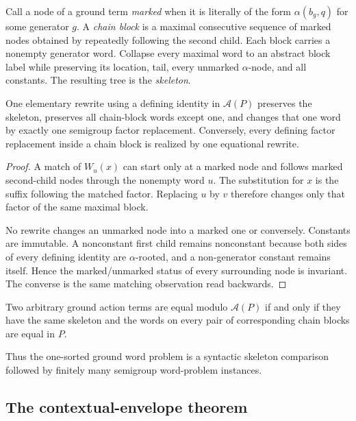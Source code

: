 Call a node of a ground term \emph{marked} when it is literally of the form $\alpha(b_g,q)$ for some generator $g$.  A \emph{chain block} is a maximal consecutive sequence of marked nodes obtained by repeatedly following the second child.  Each block carries a nonempty generator word.  Collapse every maximal word to an abstract block label while preserving its location, tail, every unmarked $\alpha$-node, and all constants.  The resulting tree is the \emph{skeleton}.

\begin{lemma}\label{lem:skeleton}
One elementary rewrite using a defining identity in $\mathcal A(P)$ preserves the skeleton, preserves all chain-block words except one, and changes that one word by exactly one semigroup factor replacement.  Conversely, every defining factor replacement inside a chain block is realized by one equational rewrite.
\end{lemma}

\begin{proof}
A match of $W_u(x)$ can start only at a marked node and follows marked second-child nodes through the nonempty word $u$.  The substitution for $x$ is the suffix following the matched factor.  Replacing $u$ by $v$ therefore changes only that factor of the same maximal block.

No rewrite changes an unmarked node into a marked one or conversely.  Constants are immutable.  A nonconstant first child remains nonconstant because both sides of every defining identity are $\alpha$-rooted, and a non-generator constant remains itself.  Hence the marked/unmarked status of every surrounding node is invariant.  The converse is the same matching observation read backwards.
\end{proof}

\begin{corollary}\label{cor:skeleton}
Two arbitrary ground action terms are equal modulo $\mathcal A(P)$ if and only if they have the same skeleton and the words on every pair of corresponding chain blocks are equal in $P$.
\end{corollary}

Thus the one-sorted ground word problem is a syntactic skeleton comparison followed by finitely many semigroup word-problem instances.

\subsection{The contextual-envelope theorem}

